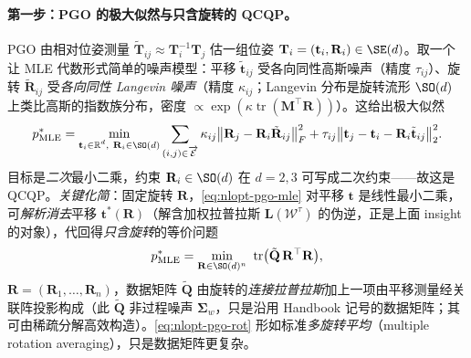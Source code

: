 \paragraph{第一步：PGO 的极大似然与只含旋转的 QCQP。}\cite{rosen2019sesync}
PGO 由相对位姿测量 $\tilde{\mathbf{T}}_{ij}\approx\mathbf{T}_i^{-1}\mathbf{T}_j$ 估一组位姿 $\mathbf{T}_i=(\mathbf{t}_i,\mathbf{R}_i)\in\SE(d)$。取一个让 MLE 代数形式简单的噪声模型：平移 $\tilde{\mathbf{t}}_{ij}$ 受各向同性高斯噪声（精度 $\tau_{ij}$）、旋转 $\tilde{\mathbf{R}}_{ij}$ 受\emph{各向同性 Langevin 噪声}（精度 $\kappa_{ij}$；Langevin 分布是旋转流形 $\SO(d)$ 上类比高斯的指数族分布，密度 $\propto\exp(\kappa\operatorname{tr}(\mathbf{M}^\top\mathbf{R}))$）。这给出极大似然
\begin{equation}
  p^*_{\mathrm{MLE}}=\min_{\substack{\mathbf{t}_i\in\mathbb{R}^d,\ \mathbf{R}_i\in\SO(d)}}
  \sum_{(i,j)\in\overrightarrow{\mathcal{E}}}\kappa_{ij}\big\|\mathbf{R}_j-\mathbf{R}_i\tilde{\mathbf{R}}_{ij}\big\|_F^2
  +\tau_{ij}\big\|\mathbf{t}_j-\mathbf{t}_i-\mathbf{R}_i\tilde{\mathbf{t}}_{ij}\big\|_2^2.
  \label{eq:nlopt-pgo-mle}
\end{equation}
目标是\emph{二次}最小二乘，约束 $\mathbf{R}_i\in\SO(d)$ 在 $d{=}2,3$ 可写成二次约束——故这是 QCQP。\emph{关键化简}：固定旋转 $\mathbf{R}$，\cref{eq:nlopt-pgo-mle} 对平移 $\mathbf{t}$ 是线性最小二乘，可\emph{解析消去}平移 $\mathbf{t}^*(\mathbf{R})$（解含加权拉普拉斯 $\mathbf{L}(\mathcal{W}^\tau)$ 的伪逆，正是上面 insight 的对象），代回得\emph{只含旋转}的等价问题
\begin{equation}
  p^*_{\mathrm{MLE}}=\min_{\mathbf{R}\in\SO(d)^n}\ \operatorname{tr}\!\big(\tilde{\mathbf{Q}}\,\mathbf{R}^\top\mathbf{R}\big),
  \label{eq:nlopt-pgo-rot}
\end{equation}
$\mathbf{R}=(\mathbf{R}_1,\dots,\mathbf{R}_n)$，数据矩阵 $\tilde{\mathbf{Q}}$ 由旋转的\emph{连接拉普拉斯}加上一项由平移测量经关联阵投影构成（此 $\tilde{\mathbf{Q}}$ 非过程噪声 $\boldsymbol{\Sigma}_w$，只是沿用 Handbook 记号的数据矩阵；其可由稀疏分解高效构造）。\cref{eq:nlopt-pgo-rot} 形如标准\emph{多旋转平均}（multiple rotation averaging），只是数据矩阵更复杂。

